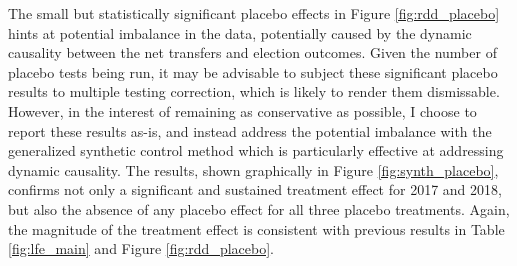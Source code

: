 \documentclass[12pt]{article}
\newcommand{\1}{\mathbbm{1}}
\begin{document}
The small but statistically significant placebo effects in Figure \ref{fig:rdd_placebo} hints at potential imbalance in the data, potentially caused by the dynamic causality between the net transfers and election outcomes. Given the number of placebo tests being run, it may be advisable to subject these significant placebo results to multiple testing correction, which is likely to render them dismissable. However, in the interest of remaining as conservative as possible, I choose to report these results as-is, and instead address the potential imbalance with the generalized synthetic control method \cite{Xu2017gsynth} which is particularly effective at addressing dynamic causality. The results, shown graphically in Figure \ref{fig:synth_placebo}, confirms not only a significant and sustained treatment effect for 2017 and 2018, but also the absence of any placebo effect for all three placebo treatments. Again, the magnitude of the treatment effect is consistent with previous results in Table \ref{fig:lfe_main} and Figure \ref{fig:rdd_placebo}.
\end{document}
